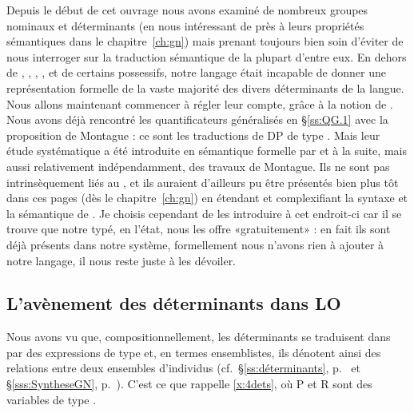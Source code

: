 Depuis le début de cet ouvrage nous avons examiné de nombreux groupes nominaux et déterminants (en nous intéressant de près à leurs propriétés sémantiques dans le chapitre~\ref{ch:gn}) mais prenant toujours bien soin d'éviter de nous interroger sur la traduction sémantique de la plupart d'entre eux.  
En dehors de , , , ,  et de certains possessifs, notre langage {\LO} était incapable de donner une représentation formelle de la vaste majorité des divers déterminants de la langue.  Nous allons maintenant commencer à régler leur compte, grâce à la notion de . 
Nous avons déjà rencontré les quantificateurs généralisés en \S\ref{ss:QG.1} avec la proposition de Montague : ce sont les traductions de DP de type \ett.
Mais leur étude systématique a été introduite en sémantique formelle par 
\citet{BarwiseCooper:81} et \citet{KeenanStavi:86}
à la suite, mais aussi relativement indépendamment, des travaux de Montague.  Ils ne sont pas intrinsèquement liés au \lcalcul, et ils auraient d'ailleurs pu être présentés bien plus tôt dans ces pages (dès le chapitre~\ref{ch:gn}) en  étendant et complexifiant la syntaxe et la sémantique de {\LO}.  Je choisis cependant de les introduire à cet endroit-ci car il se trouve que notre {\LO} typé, en l'état, nous les offre {«gratuitement»} : en fait ils sont déjà présents dans notre système, formellement nous n'avons rien à ajouter à notre langage, il nous reste juste à les dévoiler.



\subsection{L'avènement des déterminants dans LO}
\label{ss:QGDet}

Nous avons vu que, compositionnellement, les déterminants se traduisent dans {\LO} par des expressions de type \type{\et,\ett} et, en termes ensemblistes, ils dénotent ainsi des relations entre deux ensembles d'individus (cf.\ \S\ref{ss:déterminants}, p.~\pageref{ss:déterminants} et \S\ref{sss:SyntheseGN}, p.~\pageref{x:QEns1}).  C'est ce que rappelle \ref{x:4dets}, où \vrb P et \vrb R sont des variables de type \et.

